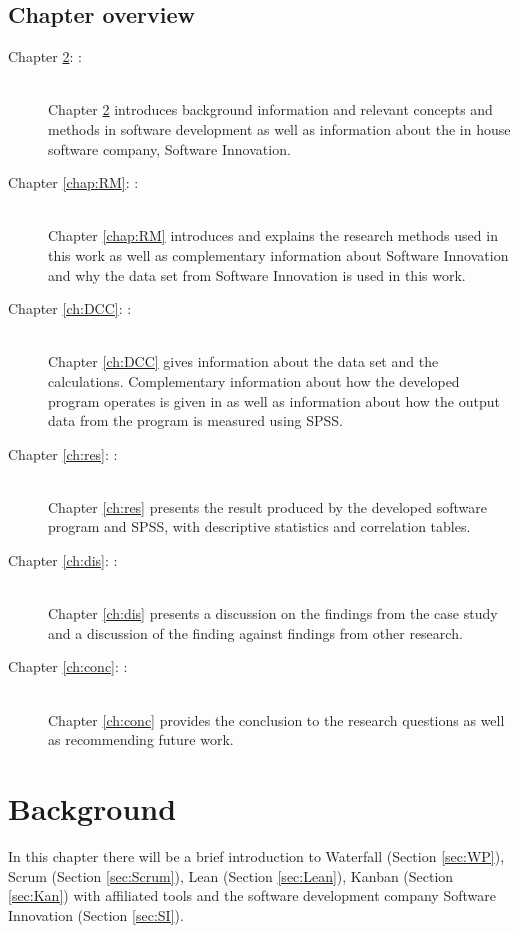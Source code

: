 \documentclass[UKenglish]{ifimaster}  %
\begin{document}
\section{Chapter overview}
\begin{description}
\item[Chapter \ref{chap:Background}: :] \hfill \\  
Chapter \ref{chap:Background} introduces background information and relevant concepts and methods in software development as well as information about the in house software company, Software Innovation. 
\item[Chapter \ref{chap:RM}: :] \hfill \\  
Chapter \ref{chap:RM} introduces and explains the research methods used in this work as well as complementary information about Software Innovation and why the data set from Software Innovation is used in this work.  
\item[Chapter \ref{ch:DCC}: :] \hfill \\
Chapter \ref{ch:DCC} gives information about the data set and the calculations. Complementary information about how the developed program operates is given in as well as information about how the output data from the program is measured using SPSS.

\item[Chapter \ref{ch:res}: :] \hfill \\
Chapter \ref{ch:res} presents the result produced by the developed software program and SPSS, with descriptive statistics and correlation tables. 
\item[Chapter \ref{ch:dis}: :] \hfill \\
Chapter \ref{ch:dis} presents a discussion on the findings from the case study and a discussion of the finding against findings from other research. 
\item[Chapter \ref{ch:conc}: :] \hfill \\
Chapter \ref{ch:conc} provides the conclusion to the research questions as well as recommending future work.
\end{description}


\chapter{Background}  
\label{chap:Background}                %
In this chapter there will be a brief introduction to Waterfall (Section \ref{sec:WP}), Scrum (Section \ref{sec:Scrum}), Lean (Section \ref{sec:Lean}), Kanban (Section \ref{sec:Kan}) with affiliated tools and the software development company Software Innovation (Section \ref{sec:SI}).
\end{document}
